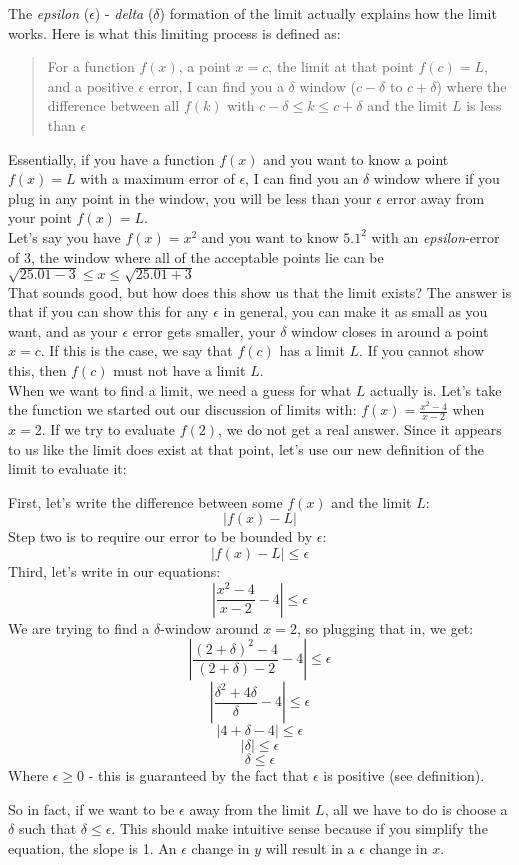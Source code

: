 \documentclass[../revisedmain.tex]{subfiles}
\begin{document}
	The \textit{epsilon} ($\epsilon$) - \textit{delta} ($\delta$) formation of the limit actually explains how the limit works. Here is what this limiting process is defined as:
	\begin{quote}
		For a function $f(x)$, a point $x=c$, the limit at that point $f(c)=L$, and a positive $\epsilon$ error, I can find you a $\delta$ window ($c-\delta$ to $c+\delta$) where the difference between all $f(k)$ with $c-\delta\le k\le c+\delta$ and the limit $L$ is less than $\epsilon$
	\end{quote}
	Essentially, if you have a function $f(x)$ and you want to know a point $f(x)=L$ with a maximum error of $\epsilon$, I can find you an $\delta$ window where if you plug in any point in the window, you will be less than your $\epsilon$ error away from your point $f(x)=L$.\\
	Let's say you have $f(x)=x^2$ and you want to know $5.1^2$ with an \textit{epsilon}-error of 3, the window where all of the acceptable points lie can be $\sqrt{25.01-3}\le x\le\sqrt{25.01+3}$\\\newline
	That sounds good, but how does this show us that the limit exists? The answer is that if you can show this for any $\epsilon$ in general, you can make it as small as you want, and as your $\epsilon$ error gets smaller, your $\delta$ window closes in around a point $x=c$. If this is the case, we say that $f(c)$ has a limit $L$. If you cannot show this, then $f(c)$ must not have a limit $L$.\\\newline
	When we want to find a limit, we need a guess for what $L$ actually is. Let's take the function we started out our discussion of limits with: $f(x)=\displaystyle\frac{x^2-4}{x-2}$ when $x=2$. If we try to evaluate $f(2)$, we do not get a real answer. Since it appears to us like the limit does exist at that point, let's use our new definition of the limit to evaluate it:
	\begin{center}
		First, let's write the difference between some $f(x)$ and the limit $L$:
		$$|f(x)-L|$$
		Step two is to require our error to be bounded by $\epsilon$:
		$$|f(x)-L|\le\epsilon$$
		Third, let's write in our equations:
		$$\left|\frac{x^2-4}{x-2}-4\right|\le\epsilon$$
		We are trying to find a $\delta$-window around $x=2$, so plugging that in, we get:
		$$\left|\frac{(2+\delta)^2-4}{(2+\delta)-2}-4\right|\le\epsilon$$
		$$\left|\frac{\delta^2+4\delta}{\delta}-4\right|\le\epsilon$$
		$$\left|4+\delta-4\right|\le\epsilon$$
		$$\left|\delta\right|\le\epsilon$$
		$$\delta\le\epsilon$$
		Where $\epsilon\ge 0$ - this is guaranteed by the fact that $\epsilon$ is positive (see definition).
		\end{center}
	So in fact, if we want to be $\epsilon$ away from the limit $L$, all we have to do is choose a $\delta$ such that $\delta\le\epsilon$. This should make intuitive sense because if you simplify the equation, the slope is 1. An $\epsilon$ change in $y$ will result in a $\epsilon$ change in $x$.
\end{document}

